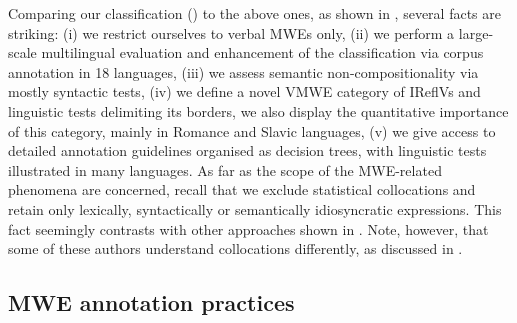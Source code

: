 \documentclass[output=paper,
modfonts,
]{langscibook}
\begin{document}
Comparing our classification () to the above ones, as shown in , several facts are striking: (i) we restrict ourselves to verbal MWEs only, (ii) we perform a large-scale multilingual evaluation and enhancement of the classification via corpus annotation in 18 languages, (iii) we assess semantic non-compositionality via mostly syntactic tests, (iv) we define a novel VMWE category of IReflVs and linguistic tests delimiting its borders, we also display the quantitative importance of this category, mainly in Romance and Slavic languages, (v) we give access to detailed annotation guidelines organised as decision trees, with linguistic tests illustrated in many languages. As far as the scope of the MWE-related phenomena are concerned, recall that we exclude statistical collocations and retain only lexically, syntactically or semantically idiosyncratic expressions. This fact seemingly contrasts with other approaches shown in . Note, however, that some of these authors understand collocations differently, as discussed in . 

\subsection{MWE annotation practices}
\label{sec:related-practices}
\end{document}
